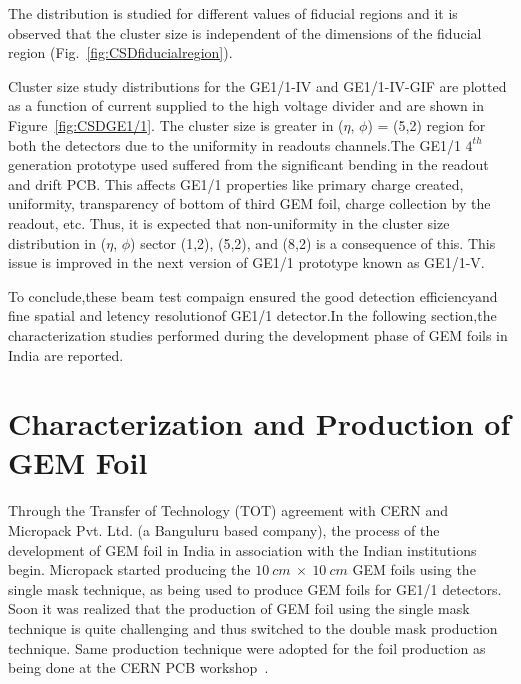 The distribution is studied for different values of fiducial regions and it is observed that the cluster size is independent of the dimensions of the fiducial region (Fig.~\ref{fig:CSDfiducialregion}).

Cluster size study distributions for the GE1/1-IV and GE1/1-IV-GIF are plotted as a function of current supplied to the high voltage divider and are shown in Figure~\ref{fig:CSDGE1/1}.
The cluster size is greater in ($\eta$, $\phi$) = (5,2) region for both the detectors due to the uniformity in readouts channels.The GE1/1 $4^{th}$ generation prototype used suffered from the significant bending in the readout and drift PCB. This affects GE1/1 properties like primary charge created, uniformity, transparency of bottom of third GEM foil, charge collection by the readout, etc. Thus, it is expected that non-uniformity in the cluster size distribution in ($\eta$, $\phi$) sector (1,2), (5,2), and (8,2) is a consequence of this. This issue is improved in the next version of GE1/1 prototype known as GE1/1-V.

To conclude,these beam test compaign ensured the good detection efficiencyand fine spatial and letency resolutionof GE1/1 detector.In the following section,the characterization studies performed during the development phase of GEM foils in India are reported. 


\section{Characterization and Production of GEM Foil} %
\label{sec:characterization_and_production_of_gem_foil}
Through the Transfer of Technology (TOT) agreement with CERN and Micropack Pvt. Ltd. (a Banguluru based company), the process of the development of GEM foil in India in association with the Indian institutions begin.
Micropack started producing the $10~cm~\times~10~cm$ GEM foils using the single mask technique, as  being used to produce GEM foils for GE1/1 detectors.
Soon it was realized that the production of GEM foil using the single mask technique is quite challenging and thus switched to the double mask production technique.
Same production technique were adopted for the foil production as being done at the CERN PCB workshop~\cite{DEOLIVEIRA2009}.

